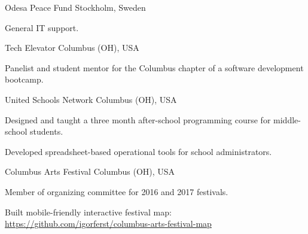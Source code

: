 

\begin{cventries}

  \cventryshort
    {Odesa Peace Fund} %
    {Stockholm, Sweden} %
    {
      \begin{cvitems} %
        \item {General IT support.}
      \end{cvitems}
    }

  \cventryshort
    {Tech Elevator} %
    {Columbus (OH), USA} %
    {
      \begin{cvitems} %
        \item {Panelist and student mentor for the Columbus chapter of a software development bootcamp.}
      \end{cvitems}
    }

  \cventryshort
    {United Schools Network} %
    {Columbus (OH), USA} %
    {
      \begin{cvitems} %
        \item {Designed and taught a three month after-school programming course for middle-school students.}
        \item {Developed spreadsheet-based operational tools for school administrators.}
      \end{cvitems}
    }

  \cventryshort
    {Columbus Arts Festival} %
    {Columbus (OH), USA} %
    {
      \begin{cvitems} %
        \item {Member of organizing committee for 2016 and 2017 festivals.}
        \item {Built mobile-friendly interactive festival map: \url{https://github.com/igorferst/columbus-arts-festival-map}}
      \end{cvitems}
    }

\end{cventries}
